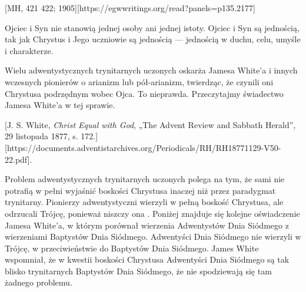 [MH, 421 422; 1905][https://egwwritings.org/read?panels=p135.2177]

Ojciec i Syn nie stanowią jednej osoby ani jednej istoty. Ojciec i Syn są jednością, tak jak Chrystus i Jego uczniowie są jednością — jednością w duchu, celu, umyśle i charakterze.

Wielu adwentystycznych trynitarnych uczonych oskarża Jamesa White'a i innych wczesnych pionierów o arianizm lub pół-arianizm, twierdząc, że czynili oni Chrystusa podrzędnym wobec Ojca. To nieprawda. Przeczytajmy świadectwo Jamesa White'a w tej sprawie.


[J. S. White, \textit{Christ Equal with God}, „The Advent Review and Sabbath Herald”, 29 listopada 1877, s. 172.][https://documents.adventistarchives.org/Periodicals/RH/RH18771129-V50-22.pdf].

Problem adwentystycznych trynitarnych uczonych polega na tym, że sami nie potrafią w pełni wyjaśnić boskości Chrystusa inaczej niż przez paradygmat trynitarny. Pionierzy adwentystyczni wierzyli w pełną boskość Chrystusa, ale odrzucali Trójcę, ponieważ niszczy ona .  Poniżej znajduje się kolejne oświadczenie Jamesa White'a, w którym porównał wierzenia Adwentystów Dnia Siódmego z wierzeniami Baptystów Dnia Siódmego. Adwentyści Dnia Siódmego nie wierzyli w Trójcę, w przeciwieństwie do Baptystów Dnia Siódmego. James White wspomniał, że w kwestii boskości Chrystusa Adwentyści Dnia Siódmego są tak blisko trynitarnych Baptystów Dnia Siódmego, że nie spodziewają się tam żadnego problemu.

